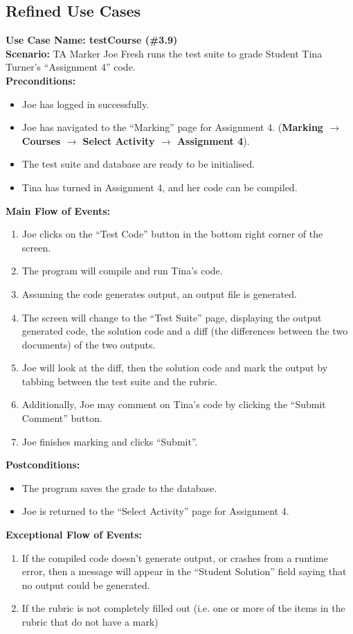 \documentclass{article}
\begin{document}
\subsection{Refined Use Cases}
\textbf{Use Case Name: testCourse (\#3.9)}\\
\textbf{Scenario:}
TA Marker Joe Fresh runs the test suite to grade Student Tina Turner’s “Assignment 4” 
code.\\
\textbf{Preconditions:}
\begin{itemize}
	\item Joe has logged in successfully.
	\item Joe has navigated to the “Marking” page for Assignment 4. (\textbf{Marking 
		$\rightarrow$ Courses $\rightarrow$ Select Activity $\rightarrow$ Assignment 4}).
	\item The test suite  and database are ready to be initialised.
	\item Tina has turned in Assignment 4, and her code can be compiled.
\end{itemize}
\textbf{Main Flow of Events:}
\begin{enumerate} 
	\item Joe clicks on the “Test Code” button in the bottom right corner of the screen.
	\item The program will compile and run Tina’s  code.
	\item Assuming the code generates output, an output file is generated.
	\item The screen will change to the “Test Suite” page, displaying the output 
		generated code, the solution code and a diff (the differences between the 
		two documents) of the two outputs.
	\item Joe will look at the diff, then the solution code and mark the output by
		tabbing between the test suite and the rubric.	
	\item Additionally, Joe may comment on Tina’s code by 	clicking the “Submit 
		Comment” button.
	\item Joe finishes marking and clicks “Submit”.
\end{enumerate}
\textbf{Postconditions:}
\begin{itemize}
\item The program saves the grade to the database. 
\item Joe is returned to the “Select Activity” page for Assignment 4.
\end{itemize}
\textbf{Exceptional Flow of Events:}
\begin{enumerate}
 	\item If the compiled code doesn’t generate output, or crashes from a runtime 
 		error, then a message will appear in the “Student Solution” field saying that  
 		no output could be generated.
	\item If the rubric is not completely filled out (i.e. one or more of the items in the 
		rubric that do not have a mark)
\end{enumerate}
\end{document}
